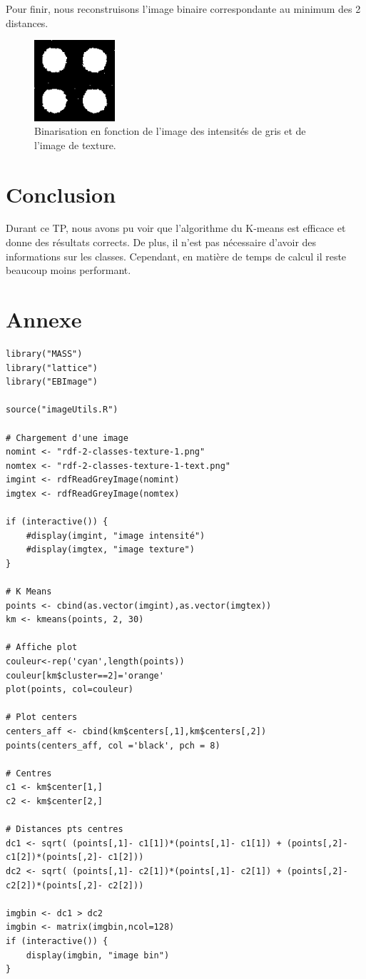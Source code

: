 \documentclass[a4paper,11pt]{article}
\begin{document}
  Pour finir, nous reconstruisons l'image binaire correspondante au minimum des 2 distances.\\
  
  \begin{figure}[H]
    \center
    \includegraphics[width=3cm]{resultat/image_binaire.png}
    \caption{Binarisation en fonction de l'image des intensités de gris et de l'image de texture.}
  \end{figure}
  
  \section*{Conclusion}
  Durant ce TP, nous avons pu voir que l'algorithme du K-means est efficace et donne des résultats 
  corrects. De plus, il n'est pas nécessaire d'avoir des informations sur les classes. Cependant, en 
  matière de temps de calcul il reste beaucoup moins performant.\\
  
  \newpage
  
  \section*{Annexe} 
  \begin{lstlisting}[caption=Macro de classification de l'image]
library("MASS")
library("lattice")
library("EBImage")

source("imageUtils.R")
  
# Chargement d'une image
nomint <- "rdf-2-classes-texture-1.png"
nomtex <- "rdf-2-classes-texture-1-text.png"
imgint <- rdfReadGreyImage(nomint)
imgtex <- rdfReadGreyImage(nomtex)

if (interactive()) {
    #display(imgint, "image intensité")
    #display(imgtex, "image texture")
}

# K Means
points <- cbind(as.vector(imgint),as.vector(imgtex))
km <- kmeans(points, 2, 30)

# Affiche plot
couleur<-rep('cyan',length(points))
couleur[km$cluster==2]='orange'
plot(points, col=couleur)

# Plot centers
centers_aff <- cbind(km$centers[,1],km$centers[,2])
points(centers_aff, col ='black', pch = 8)

# Centres
c1 <- km$center[1,]
c2 <- km$center[2,]

# Distances pts centres
dc1 <- sqrt( (points[,1]- c1[1])*(points[,1]- c1[1]) + (points[,2]- c1[2])*(points[,2]- c1[2]))
dc2 <- sqrt( (points[,1]- c2[1])*(points[,1]- c2[1]) + (points[,2]- c2[2])*(points[,2]- c2[2]))

imgbin <- dc1 > dc2
imgbin <- matrix(imgbin,ncol=128)
if (interactive()) {
    display(imgbin, "image bin")
}\end{lstlisting}


  
\end{document}
